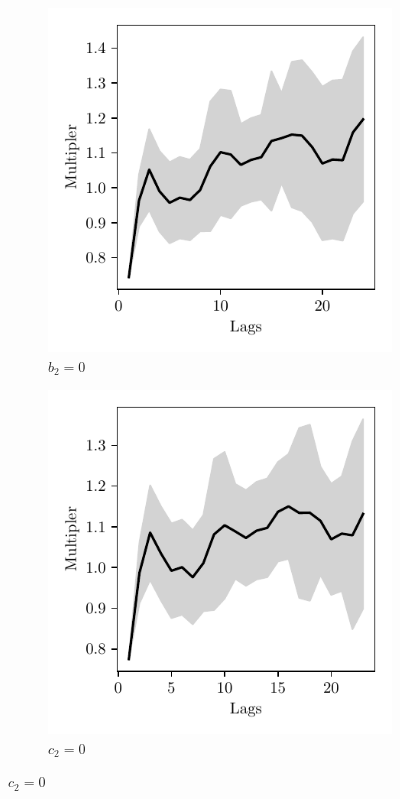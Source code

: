 \begin{figure}[t]
    \centering
    \caption{Estimated multiplier for different VAR orders}
    \begin{subfigure}{0.475\textwidth}
        \includegraphics{figures/b20_lags.pdf}
        \caption{$b_2 = 0$}
    \end{subfigure}
    \begin{subfigure}{0.475\textwidth}
        \includegraphics{figures/c20_lags.pdf}
        \caption{$c_2 = 0$}
    \end{subfigure}
    \label{fig:orders}
\end{figure}

